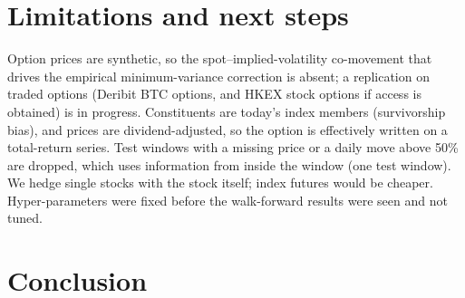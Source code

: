 \documentclass[11pt]{article}
\begin{document}
\section{Limitations and next steps}\label{sec:limits}
Option prices are synthetic, so the spot--implied-volatility co-movement that drives the empirical
minimum-variance correction \citep{hull2017optimal,zernikov2026learn} is absent; a replication on
traded options (Deribit BTC options, and HKEX stock options if access is obtained) is in progress.
Constituents are today's index members (survivorship bias), and prices are dividend-adjusted, so the
option is effectively written on a total-return series. Test windows with a missing price or a daily
move above 50\% are dropped, which uses information from inside the window (one test window). We hedge single stocks with the stock
itself; index futures would be cheaper. Hyper-parameters were fixed before the walk-forward results
were seen and not tuned.

\section{Conclusion}




\end{document}
